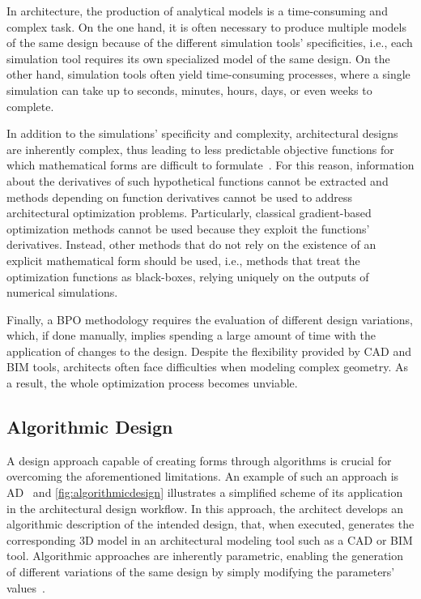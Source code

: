 	In architecture, the production of analytical models is a time-consuming and complex task. On the one hand, it is often necessary to produce multiple models of the same design because of the different simulation tools' specificities, i.e., each simulation tool requires its own specialized model of the same design. On the other hand, simulation tools often yield time-consuming processes, where a single simulation can take up to seconds, minutes, hours, days, or even weeks to complete. 
	
	In addition to the simulations' specificity and complexity, architectural designs are inherently complex, thus leading to less predictable objective functions for which mathematical forms are difficult to formulate~\cite{Machairas2014}. For this reason, information about the derivatives of such hypothetical functions cannot be extracted and methods depending on function derivatives cannot be used to address architectural optimization problems. Particularly, classical gradient-based optimization methods cannot be used because they exploit the functions' derivatives. Instead, other methods that do not rely on the existence of an explicit mathematical form should be used, i.e., methods that treat the optimization functions as black-boxes, relying uniquely on the outputs of numerical simulations.
	
	Finally, a \ac{BPO} methodology requires the evaluation of different design variations, which, if done manually, implies spending a large amount of time with the application of changes to the design. Despite the flexibility provided by \ac{CAD} and \ac{BIM} tools, architects often face difficulties when modeling complex geometry. As a result, the whole optimization process becomes unviable.
	
\subsection{Algorithmic Design}
\label{ssec:ad}
	A design approach capable of creating forms through algorithms is crucial for overcoming the aforementioned limitations. An example of such an approach is \ac{AD}~\cite{Branco2017AD} and \cref{fig:algorithmicdesign} illustrates a simplified scheme of its application in the architectural design workflow. In this approach, the architect develops an algorithmic description of the intended design, that, when executed, generates the corresponding 3D model in an architectural modeling tool such as a \ac{CAD} or \ac{BIM} tool. Algorithmic approaches are inherently parametric, enabling the generation of different variations of the same design by simply modifying the parameters' values~\cite{Leitao2014GD}. 
	
